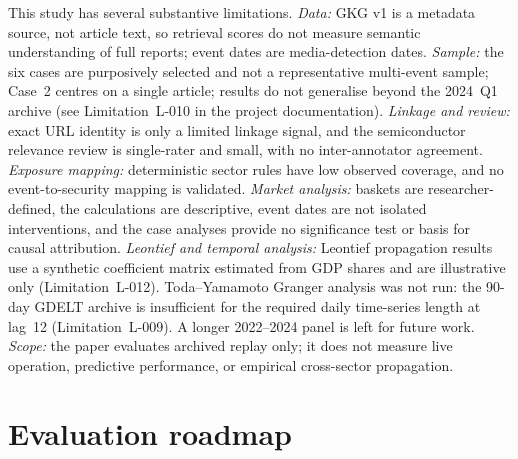 \documentclass[10pt,a4paper,twocolumn]{article}
\begin{document}
This study has several substantive limitations.
\emph{Data:} GKG v1 is a metadata source, not article text, so retrieval scores do not measure semantic understanding of full reports; event dates are media-detection dates.
\emph{Sample:} the six cases are purposively selected and not a representative multi-event sample; Case~2 centres on a single article; results do not generalise beyond the 2024~Q1 archive (see Limitation~L-010 in the project documentation).
\emph{Linkage and review:} exact URL identity is only a limited linkage signal, and the semiconductor relevance review is single-rater and small, with no inter-annotator agreement.
\emph{Exposure mapping:} deterministic sector rules have low observed coverage, and no event-to-security mapping is validated.
\emph{Market analysis:} baskets are researcher-defined, the calculations are descriptive, event dates are not isolated interventions, and the case analyses provide no significance test or basis for causal attribution.
\emph{Leontief and temporal analysis:} Leontief propagation results use a synthetic coefficient matrix estimated from GDP shares and are illustrative only (Limitation~L-012). Toda--Yamamoto Granger analysis was not run: the 90-day GDELT archive is insufficient for the required daily time-series length at lag~12 (Limitation~L-009). A longer 2022--2024 panel is left for future work.
\emph{Scope:} the paper evaluates archived replay only; it does not measure live operation, predictive performance, or empirical cross-sector propagation.

\section{Evaluation roadmap}\label{sec:future}
\end{document}
